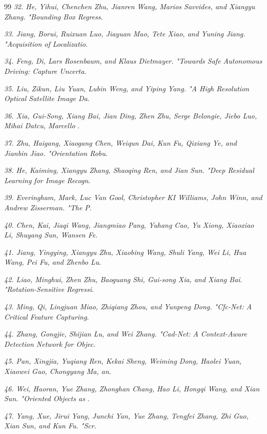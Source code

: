 \documentclass[10pt,twocolumn,final]{article}
\begin{document}
\begin{thebibliography}{99}
\textit{32.	He, Yihui, Chenchen Zhu, Jianren Wang, Marios Savvides, and Xiangyu Zhang. "Bounding Box Regress}.

\textit{33.	Jiang, Borui, Ruixuan Luo, Jiayuan Mao, Tete Xiao, and Yuning Jiang. "Acquisition of Localizatio}.

\textit{34.	Feng, Di, Lars Rosenbaum, and Klaus Dietmayer. "Towards Safe Autonomous Driving: Capture Uncerta}.

\textit{35.	Liu, Zikun, Liu Yuan, Lubin Weng, and Yiping Yang. "A High Resolution Optical Satellite Image Da}.

\textit{36.	Xia, Gui-Song, Xiang Bai, Jian Ding, Zhen Zhu, Serge Belongie, Jiebo Luo, Mihai Datcu, Marcello }.

\textit{37.	Zhu, Haigang, Xiaogang Chen, Weiqun Dai, Kun Fu, Qixiang Ye, and Jianbin Jiao. "Orientation Robu}.

\textit{38.	He, Kaiming, Xiangyu Zhang, Shaoqing Ren, and Jian Sun. "Deep Residual Learning for Image Recogn}.

\textit{39.	Everingham, Mark, Luc Van Gool, Christopher KI Williams, John Winn, and Andrew Zisserman. "The P}.

\textit{40.	Chen, Kai, Jiaqi Wang, Jiangmiao Pang, Yuhang Cao, Yu Xiong, Xiaoxiao Li, Shuyang Sun, Wansen Fe}.

\textit{41.	Jiang, Yingying, Xiangyu Zhu, Xiaobing Wang, Shuli Yang, Wei Li, Hua Wang, Pei Fu, and Zhenbo Lu}.

\textit{42.	Liao, Minghui, Zhen Zhu, Baoguang Shi, Gui-song Xia, and Xiang Bai. "Rotation-Sensitive Regressi}.

\textit{43.	Ming, Qi, Lingjuan Miao, Zhiqiang Zhou, and Yunpeng Dong. "Cfc-Net: A Critical Feature Capturing}.

\textit{44.	Zhang, Gongjie, Shijian Lu, and Wei Zhang. "Cad-Net: A Context-Aware Detection Network for Objec}.

\textit{45.	Pan, Xingjia, Yuqiang Ren, Kekai Sheng, Weiming Dong, Haolei Yuan, Xiaowei Guo, Chongyang Ma, an}.

\textit{46.	Wei, Haoran, Yue Zhang, Zhonghan Chang, Hao Li, Hongqi Wang, and Xian Sun. "Oriented Objects as }.

\textit{47.	Yang, Xue, Jirui Yang, Junchi Yan, Yue Zhang, Tengfei Zhang, Zhi Guo, Xian Sun, and Kun Fu. "Scr}.


\end{thebibliography}
\end{document}

